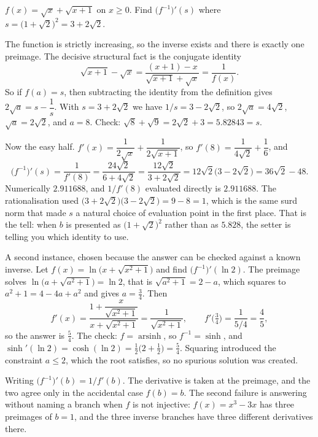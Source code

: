 \begin{worked}
$f(x)=\sqrt{x}+\sqrt{x+1}$ on $x\geq0$. Find $\bigl(f^{-1}\bigr)'(s)$ where $s=\bigl(1+\sqrt2\bigr)^{2}=3+2\sqrt2$.

The function is strictly increasing, so the inverse exists and there is exactly one preimage. The decisive structural fact is the conjugate identity
\[
\sqrt{x+1}-\sqrt{x}=\frac{(x+1)-x}{\sqrt{x+1}+\sqrt{x}}=\frac{1}{f(x)} .
\]
So if $f(a)=s$, then subtracting the identity from the definition gives $2\sqrt a=s-\dfrac1s$. With $s=3+2\sqrt2$ we have $1/s=3-2\sqrt2$, so $2\sqrt a=4\sqrt2$, $\sqrt a=2\sqrt 2$, and $a=8$. Check: $\sqrt8+\sqrt9=2\sqrt2+3=5.82843=s$.

Now the easy half. $f'(x)=\dfrac{1}{2\sqrt x}+\dfrac{1}{2\sqrt{x+1}}$, so $f'(8)=\dfrac{1}{4\sqrt2}+\dfrac16$, and
\[
\bigl(f^{-1}\bigr)'(s)=\frac{1}{f'(8)}=\frac{24\sqrt2}{6+4\sqrt2}=\frac{12\sqrt2}{3+2\sqrt2}=12\sqrt2\bigl(3-2\sqrt2\bigr)=36\sqrt2-48 .
\]
Numerically $2.911688$, and $1/f'(8)$ evaluated directly is $2.911688$. The rationalisation used $\bigl(3+2\sqrt2\bigr)\bigl(3-2\sqrt2\bigr)=9-8=1$, which is the same surd norm that made $s$ a natural choice of evaluation point in the first place. That is the tell: when $b$ is presented as $\bigl(1+\sqrt2\bigr)^{2}$ rather than as $5.828$, the setter is telling you which identity to use.

A second instance, chosen because the answer can be checked against a known inverse. Let $f(x)=\ln\bigl(x+\sqrt{x^{2}+1}\bigr)$ and find $\bigl(f^{-1}\bigr)'(\ln2)$. The preimage solves $\ln\bigl(a+\sqrt{a^{2}+1}\bigr)=\ln 2$, that is $\sqrt{a^{2}+1}=2-a$, which squares to $a^{2}+1=4-4a+a^{2}$ and gives $a=\tfrac34$. Then
\[
f'(x)=\frac{1+\dfrac{x}{\sqrt{x^{2}+1}}}{x+\sqrt{x^{2}+1}}=\frac{1}{\sqrt{x^{2}+1}},\qquad f'\bigl(\tfrac34\bigr)=\frac{1}{5/4}=\frac45,
\]
so the answer is $\tfrac54$. The check: $f=\operatorname{arsinh}$, so $f^{-1}=\sinh$, and $\sinh'(\ln2)=\cosh(\ln2)=\tfrac12\bigl(2+\tfrac12\bigr)=\tfrac54$. Squaring introduced the constraint $a\leq2$, which the root satisfies, so no spurious solution was created.
\end{worked}

\begin{trap}
Writing $\bigl(f^{-1}\bigr)'(b)=1/f'(b)$. The derivative is taken at the preimage, and the two agree only in the accidental case $f(b)=b$. The second failure is answering without naming a branch when $f$ is not injective: $f(x)=x^{3}-3x$ has three preimages of $b=1$, and the three inverse branches have three different derivatives there.
\end{trap}

